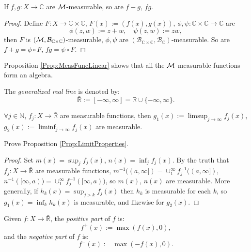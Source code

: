 \begin{prop}
    \label{Prop:MeasFuncLinear}
    If $f,g:X\rightarrow\mathbb{C}$ are 
    $\mathcal{M}$-measurable, so are $f+g$, $fg$. 
\end{prop}
\begin{proof}
    Define $F:X\rightarrow \mathbb{C}\times\mathbb{C}$, 
    $F(x):=(f(x),g(x))$, 
    $\phi,\psi:\mathbb{C}\times\mathbb{C}\rightarrow\mathbb{C}$ 
    are 
    \begin{displaymath}
        \phi(z,w):=z+w,\quad \psi(z,w):=zw,
    \end{displaymath}
    then $F$ is 
    $(\mathcal{M},\mathcal{B}_{\mathbb{C}\times\mathbb{C}})$-measurable, 
    $\phi,\psi$ are 
    $(\mathcal{B}_{\mathbb{C}\times\mathbb{C}},
    \mathcal{B}_{\mathbb{C}})$-measurable. So are 
    $f+g=\phi\circ F$, $fg=\psi\circ F$.
\end{proof}
\begin{rem}
    Proposition \ref{Prop:MeasFuncLinear} shows that 
    all the $\mathcal{M}$-measurable functions form an algebra.
\end{rem}
\begin{ntn}
    The \textit{generalized real line} 
    is denoted by:
    \begin{displaymath}
        \bar{\mathbb{R}}:=[-\infty,\infty]
        =\mathbb{R}\cup\{-\infty,\infty\}.
    \end{displaymath}
\end{ntn}
\begin{prop}
    \label{Prop:LimitProperties}
    $\forall j\in\mathbb{N}$, 
    $f_{j}:X\rightarrow\bar{\mathbb{R}}$ are 
    measurable functions, then 
    $g_{1}(x):=\limsup_{j\rightarrow\infty}f_{j}(x)$, 
    $g_{2}(x):=\liminf_{j\rightarrow\infty}f_{j}(x)$ 
    are measurable.
\end{prop}
\begin{exc}
    Prove Proposition \ref{Prop:LimitProperties}.
\end{exc}
\begin{proof}
    Set $m(x)=\sup_{j}f_{j}(x)$, $n(x)=\inf_{j}f_{j}(x)$.
    By the truth that $f_{j}:X\rightarrow\bar{\mathbb{R}}$ are 
    measurable functions, $m^{-1}((a,\infty])=
    \cup_{1}^{\infty}f_{j}^{-1}((a,\infty])$,  $n^{-1}([\infty,a))=
    \cup_{1}^{\infty}f_{j}^{-1}([\infty,a))$, so $m(x)$, $n(x)$
    are measurable. More generally, if $h_k(x)=\sup_{j>k}f_j(x)$
    then $h_k$ is measurable for each $k$, so $g_1(x)=\inf_{k}h_k(x)$
    is measurable, and likewise for $g_2(x)$.
\end{proof}
\begin{defn}
    Given $f:X\rightarrow\bar{\mathbb{R}}$, 
    the \textit{positive part }of $f$ is:
    \begin{displaymath}
        f^{+}(x):=\max(f(x),0),
    \end{displaymath}
    and the \textit{negative part }of $f$ 
    is:
    \begin{displaymath}
        f^{-}(x):=\max(-f(x),0).
    \end{displaymath}
\end{defn}
